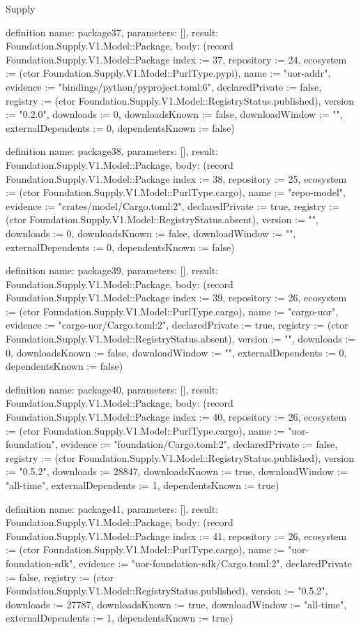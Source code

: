 \begin{lexlean}{Supply}
\begin{semanticmodule}
definition{
  name: package37,
  parameters: [],
  result: Foundation.Supply.V1.Model::Package,
  body: (record Foundation.Supply.V1.Model::Package {index := 37, repository := 24, ecosystem := (ctor Foundation.Supply.V1.Model::PurlType.pypi), name := "uor-addr", evidence := "bindings/python/pyproject.toml:6", declaredPrivate := false, registry := (ctor Foundation.Supply.V1.Model::RegistryStatus.published), version := "0.2.0", downloads := 0, downloadsKnown := false, downloadWindow := "", externalDependents := 0, dependentsKnown := false})
}

definition{
  name: package38,
  parameters: [],
  result: Foundation.Supply.V1.Model::Package,
  body: (record Foundation.Supply.V1.Model::Package {index := 38, repository := 25, ecosystem := (ctor Foundation.Supply.V1.Model::PurlType.cargo), name := "repo-model", evidence := "crates/model/Cargo.toml:2", declaredPrivate := true, registry := (ctor Foundation.Supply.V1.Model::RegistryStatus.absent), version := "", downloads := 0, downloadsKnown := false, downloadWindow := "", externalDependents := 0, dependentsKnown := false})
}

definition{
  name: package39,
  parameters: [],
  result: Foundation.Supply.V1.Model::Package,
  body: (record Foundation.Supply.V1.Model::Package {index := 39, repository := 26, ecosystem := (ctor Foundation.Supply.V1.Model::PurlType.cargo), name := "cargo-uor", evidence := "cargo-uor/Cargo.toml:2", declaredPrivate := true, registry := (ctor Foundation.Supply.V1.Model::RegistryStatus.absent), version := "", downloads := 0, downloadsKnown := false, downloadWindow := "", externalDependents := 0, dependentsKnown := false})
}

definition{
  name: package40,
  parameters: [],
  result: Foundation.Supply.V1.Model::Package,
  body: (record Foundation.Supply.V1.Model::Package {index := 40, repository := 26, ecosystem := (ctor Foundation.Supply.V1.Model::PurlType.cargo), name := "uor-foundation", evidence := "foundation/Cargo.toml:2", declaredPrivate := false, registry := (ctor Foundation.Supply.V1.Model::RegistryStatus.published), version := "0.5.2", downloads := 28847, downloadsKnown := true, downloadWindow := "all-time", externalDependents := 1, dependentsKnown := true})
}

definition{
  name: package41,
  parameters: [],
  result: Foundation.Supply.V1.Model::Package,
  body: (record Foundation.Supply.V1.Model::Package {index := 41, repository := 26, ecosystem := (ctor Foundation.Supply.V1.Model::PurlType.cargo), name := "uor-foundation-sdk", evidence := "uor-foundation-sdk/Cargo.toml:2", declaredPrivate := false, registry := (ctor Foundation.Supply.V1.Model::RegistryStatus.published), version := "0.5.2", downloads := 27787, downloadsKnown := true, downloadWindow := "all-time", externalDependents := 1, dependentsKnown := true})
}


\end{semanticmodule}
\end{lexlean}
